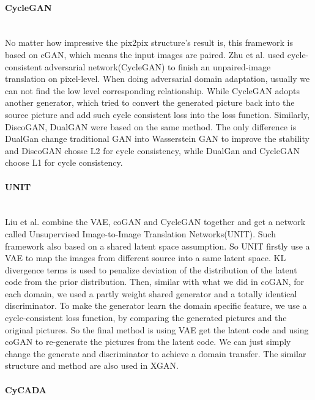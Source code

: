 \documentclass{kththesis}
\begin{document}
\paragraph{CycleGAN}~{}\\

\noindent No matter how impressive the pix2pix structure's result is, this framework is based on cGAN, which means the input images are paired. Zhu et al.\cite{zhu2017unpaired} used cycle-consistent adversarial network(CycleGAN) to finish an unpaired-image translation on pixel-level. When doing adversarial domain adaptation, usually we can not find the low level corresponding relationship. While CycleGAN adopts another generator, which tried to convert the generated picture back into the source picture and add such cycle consistent loss into the loss function. Similarly, DiscoGAN\cite{kim2017learning}, DualGAN\cite{yi2017dualgan} were based on the same method. The only difference is DualGan change traditional GAN into Wasserstein GAN\cite{arjovsky2017wasserstein} to improve the stability and DiscoGAN chosse L2 for cycle consistency, while DualGan and CycleGAN choose L1 for cycle consistency. 

\paragraph{UNIT}~{}\\

\noindent Liu et al.\cite{liu2017unsupervised} combine the VAE\cite{kingma2013auto,rezende2014stochastic}, coGAN and CycleGAN together and get a network called Unsupervised Image-to-Image Translation Networks(UNIT). Such framework also based on a shared latent space assumption. So UNIT firstly use a VAE to map the images from different source into a same latent space. KL divergence terms is used to penalize deviation of the distribution of the latent code from the prior distribution. Then, similar with what we did in coGAN, for each domain, we used a partly weight shared generator and a totally identical discriminator. To make the generator learn the domain specific feature, we use a cycle-consistent loss function, by comparing the generated pictures and the original pictures. So the final method is using VAE get the latent code and using coGAN to re-generate the pictures from the latent code. We can just simply change the generate and discriminator to achieve a domain transfer. The similar structure and method are also used in XGAN.\cite{royer2017xgan}

\paragraph{CyCADA}~{}\\
\end{document}
